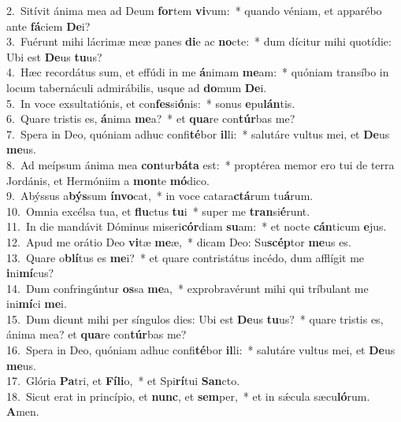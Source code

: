 {2.~}Sitívit ánima mea ad Deum \textbf{for}tem \textbf{vi}vum:~* quando véniam, et apparébo ante \textbf{fá}ciem \textbf{De}i?\\
{3.~}Fuérunt mihi lácrimæ meæ panes \textbf{di}e ac \textbf{no}cte:~* dum dícitur mihi quotídie: Ubi est \textbf{De}us \textbf{tu}us?\\
{4.~}Hæc recordátus sum, et effúdi in me \textbf{á}nimam \textbf{me}am:~* quóniam transíbo in locum tabernáculi admirábilis, usque ad \textbf{do}mum \textbf{De}i.\\
{5.~}In voce exsultatiónis, et con\textbf{fes}si\textbf{ó}nis:~* sonus \textbf{e}pu\textbf{lán}tis.\\
{6.~}Quare tristis es, \textbf{á}nima \textbf{me}a?~* et \textbf{qua}re con\textbf{túr}bas me?\\
{7.~}Spera in Deo, quóniam adhuc confi\textbf{té}bor \textbf{il}li:~* salutáre vultus mei, et \textbf{De}us \textbf{me}us.\\
{8.~}Ad meípsum ánima mea \textbf{con}tur\textbf{bá}\textbf{ta} est:~* proptérea memor ero tui de terra Jordánis, et Hermóniim a \textbf{mon}te \textbf{mó}dico.\\
{9.~}Abýssus a\textbf{býs}sum \textbf{ín}\textbf{vo}cat,~* in voce catara\textbf{ctá}rum tu\textbf{á}rum.\\
{10.~}Omnia excélsa tua, et \textbf{flu}ctus \textbf{tu}i~* super me \textbf{tran}si\textbf{é}runt.\\
{11.~}In die mandávit Dóminus miseri\textbf{cór}diam \textbf{su}am:~* et nocte \textbf{cán}ticum \textbf{e}jus.\\
{12.~}Apud me orátio Deo \textbf{vi}tæ \textbf{me}æ,~* dicam Deo: Su\textbf{scép}tor \textbf{me}us es.\\
{13.~}Quare o\textbf{blí}tus es \textbf{me}i?~* et quare contristátus incédo, dum afflígit me \textbf{i}ni\textbf{mí}cus?\\
{14.~}Dum confringúntur \textbf{os}sa \textbf{me}a,~* exprobravérunt mihi qui tríbulant me ini\textbf{mí}ci \textbf{me}i.\\
{15.~}Dum dicunt mihi per síngulos dies: Ubi est \textbf{De}us \textbf{tu}us?~* quare tristis es, ánima mea? et \textbf{qua}re con\textbf{túr}bas me?\\
{16.~}Spera in Deo, quóniam adhuc confi\textbf{té}bor \textbf{il}li:~* salutáre vultus mei, et \textbf{De}us \textbf{me}us.\\
{17.~}Glória \textbf{Pa}tri, et \textbf{Fí}\textbf{li}o,~* et Spi\textbf{rí}tui \textbf{San}cto.\\
{18.~}Sicut erat in princípio, et \textbf{nunc}, et \textbf{sem}per,~* et in sǽcula sæcu\textbf{ló}rum. \textbf{A}men.\\
